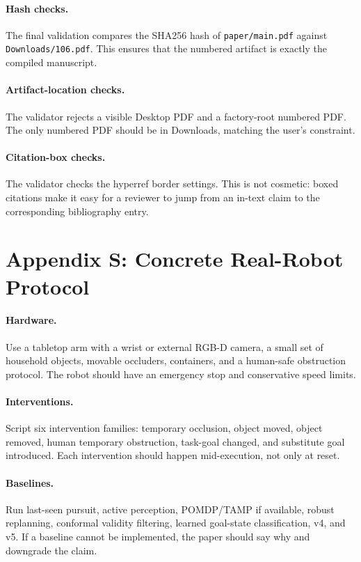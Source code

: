 \documentclass{article}
\begin{document}
\paragraph{Hash checks.}
The final validation compares the SHA256 hash of \texttt{paper/main.pdf} against \texttt{Downloads/106.pdf}. This ensures that the numbered artifact is exactly the compiled manuscript.

\paragraph{Artifact-location checks.}
The validator rejects a visible Desktop PDF and a factory-root numbered PDF. The only numbered PDF should be in Downloads, matching the user's constraint.

\paragraph{Citation-box checks.}
The validator checks the hyperref border settings. This is not cosmetic: boxed citations make it easy for a reviewer to jump from an in-text claim to the corresponding bibliography entry.

\section{Appendix S: Concrete Real-Robot Protocol}
\paragraph{Hardware.}
Use a tabletop arm with a wrist or external RGB-D camera, a small set of household objects, movable occluders, containers, and a human-safe obstruction protocol. The robot should have an emergency stop and conservative speed limits.

\paragraph{Interventions.}
Script six intervention families: temporary occlusion, object moved, object removed, human temporary obstruction, task-goal changed, and substitute goal introduced. Each intervention should happen mid-execution, not only at reset.

\paragraph{Baselines.}
Run last-seen pursuit, active perception, POMDP/TAMP if available, robust replanning, conformal validity filtering, learned goal-state classification, v4, and v5. If a baseline cannot be implemented, the paper should say why and downgrade the claim.
\end{document}
